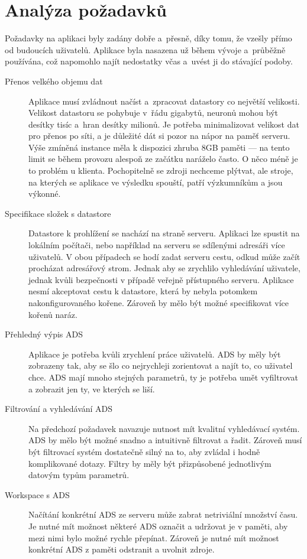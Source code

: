 \chapter{Analýza požadavků}
\label{chap:requirements}

Požadavky na aplikaci byly zadány dobře a~přesně, díky tomu, že vzešly přímo od budoucích uživatelů. Aplikace byla nasazena už během vývoje a~průběžně používána, což napomohlo najít nedostatky včas a~uvést ji do stávající podoby.

\begin{description}
  \item[Přenos velkého objemu dat] Aplikace musí zvládnout načíst a~zpracovat datastory co největší velikosti. Velikost datastoru se pohybuje v~řádu gigabytů, neuronů mohou být desítky tisíc a~hran desítky milionů. Je potřeba minimalizovat velikost dat pro přenos po síti, a je důležité dát si pozor na nápor na paměť serveru. Výše zmíněná instance měla k dispozici zhruba 8GB paměti --- na tento limit se během provozu alespoň ze začátku naráželo často. O něco méně je to problém u klienta. Pochopitelně se zdroji nechceme plýtvat, ale stroje, na kterých se aplikace ve výsledku spouští, patří výzkumníkům a jsou výkonné.
  \item[Specifikace složek s datastore] Datastore k prohlížení se nachází na straně serveru. Aplikaci lze spustit na lokálním počítači, nebo například na serveru se sdílenými adresáři více uživatelů. V obou případech se hodí zadat serveru cestu, odkud může začít procházat adresářový strom. Jednak aby se zrychlilo vyhledávání uživatele, jednak kvůli bezpečnosti v případě veřejně přístupného serveru. Aplikace nesmí akceptovat cestu k datastore, která by nebyla potomkem nakonfigurovaného kořene. Zároveň by mělo být možné specifikovat více kořenů naráz.
  \item[Přehledný výpis ADS] Aplikace je potřeba kvůli zrychlení práce uživatelů. ADS by měly být zobrazeny tak, aby se šlo co nejrychleji zorientovat a najít to, co uživatel chce. ADS mají mnoho stejných parametrů, ty je potřeba umět vyfiltrovat a zobrazit jen ty, ve kterých se liší.
  \item[Filtrování a vyhledávání ADS] Na předchozí požadavek navazuje nutnost mít kvalitní vyhledávací systém. ADS by mělo být možné snadno a intuitivně filtrovat a řadit. Zároveň musí být filtrovací systém dostatečně silný na to, aby zvládal i hodně komplikované dotazy. Filtry by měly být přizpůsobené jednotlivým datovým typům parametrů.
  \item[Workspace s ADS] Načítání konkrétní ADS ze serveru může zabrat netriviální množství času. Je nutné mít možnost některé ADS označit a udržovat je v paměti, aby mezi nimi bylo možné rychle přepínat. Zároveň je nutné mít možnost konkrétní ADS z paměti odstranit a uvolnit zdroje.

\end{description}
